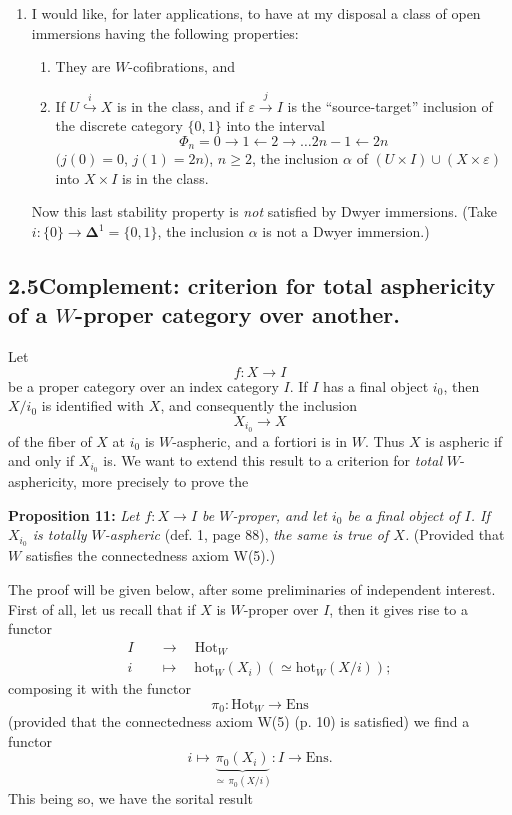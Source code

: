\documentclass[11pt]{article}
\newcommand{\printedpage}[1]{\marginpar{\footnotesize p.~#1}}
\newcommand{\msp}[1]{\marginpar{\footnotesize [#1]}}
\begin{document}
\printedpage{78}
\begin{enumerate}
\item[b)] I would like, for later applications, to have at my disposal a class of open immersions having the following properties:
\begin{enumerate}
\item[1°)] They are $W$-cofibrations, and
\item[2°)] If $U \overset{i}{\hookrightarrow} X$ is in the class, and if $\varepsilon \xrightarrow{j} I$ is the ``source-target'' inclusion of the discrete category $\{0,1\}$ into the interval
\[
\Phi_n = 0 \longrightarrow 1 \longleftarrow 2 \longrightarrow \dots 2n-1 \longleftarrow 2n
\]
$(j(0)=0$, $j(1)=2n)$, $n\geq 2$, the inclusion $\alpha$ of $(U\times I)\cup(X\times\varepsilon)$ into $X\times I$ is in the class.
\end{enumerate}
Now this last stability property is \textit{not} satisfied by Dwyer immersions. (Take $i : \{0\} \longrightarrow \boldsymbol{\Delta}^1 = \{0,1\}$, the inclusion $\alpha$ is not a Dwyer immersion.)
\end{enumerate}

\msp{page 115}

\subsection*{2.5\quad Complement: criterion for total asphericity of a $W$-proper category over another.}

Let
\[
f : X \longrightarrow I
\]
be a proper category over an index category $I$. If $I$ has a final object $i_0$, then $X/i_0$ is identified with $X$, and consequently the inclusion
\[
X_{i_0} \longrightarrow X
\]
of the fiber of $X$ at $i_0$ is $W$-aspheric, and a fortiori is in $W$. Thus $X$ is aspheric if and only if $X_{i_0}$ is. We want to extend this result to a criterion for \textit{total} $W$-asphericity, more precisely to prove the

\textbf{Proposition 11:} \textit{Let $f : X \longrightarrow I$ be $W$-proper, and let $i_0$ be a final object of $I$. If $X_{i_0}$ is totally $W$-aspheric} (def. 1, page 88), \textit{the same is true of $X$.} (Provided that $W$ satisfies the connectedness axiom W(5).)

The proof will be given below, after some preliminaries of independent interest. First of all, let us recall that if $X$ is $W$-proper over $I$, then it gives rise to a functor
\[
\begin{aligned}
I \quad &\longrightarrow \quad \mathrm{Hot}_W\\
i \quad &\longmapsto \quad \mathrm{hot}_W(X_i)(\simeq \mathrm{hot}_W(X/i));
\end{aligned}
\]
composing it with the functor
\[
\pi_0 : \mathrm{Hot}_W \longrightarrow \mathrm{Ens}
\]
(provided that the connectedness axiom W(5) (p. 10) is satisfied)
\printedpage{79}
\msp{page 116}
we find a functor
\[
i \longmapsto \underbrace{\pi_0(X_i)}_{\simeq\, \pi_0(X/i)} : I \longrightarrow \mathrm{Ens}.
\]
This being so, we have the sorital result
\end{document}
